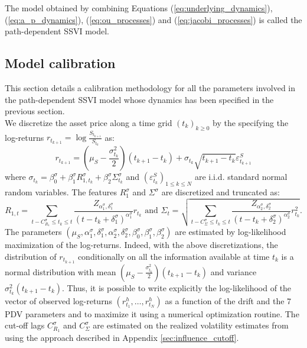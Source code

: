\begin{remark}
    The model obtained by combining Equations (\ref{eq:underlying_dynamics}), (\ref{eq:a_p_dynamics}), (\ref{eq:ou_processes}) and (\ref{eq:jacobi_processes}) is called the path-dependent SSVI model. 
\end{remark}


\subsection{Model calibration}\label{sec:model_calibration}
This section details a calibration methodology for all the parameters involved in the path-dependent SSVI model whose dynamics has been specified in the previous section. \\

We discretize the asset price along a time grid $(t_k)_{k\ge 0}$ by the specifying the log-returns $r_{t_{k+1}}=\log \frac{S_{t_{k+1}}}{S_{t_k}}$ as:
\begin{equation*}
    r_{t_{k+1}} = \left(\mu_S-\frac{\sigma_{t_k}^2}{2}\right)(t_{k+1}-t_k) + \sigma_{t_k} \sqrt{t_{k+1}-t_k} \varepsilon_{t_{k+1}}^S
\end{equation*}
where $\sigma_{t_k} = \beta_0^{\sigma}+\beta_1^{\sigma}R_{1,t_k}^{\sigma}+\beta_2^{\sigma}\Sigma_{t_k}^{\sigma}$ and $(\varepsilon^S_{t_k})_{1\le k \le N}$ are i.i.d. standard normal random variables. The features $R_1^{\sigma}$ and $\Sigma^{\sigma}$ are discretized and truncated as:
\begin{equation*}
    R_{1,t} = \sum_{t-C_{R_1}^{\sigma}\le t_k \le t} \frac{Z_{\alpha_1^{\sigma},\delta_1^{\sigma}}}{(t-t_k+\delta_1^{\sigma})^{\alpha_1^{\sigma}}} r_{t_k} \text{ and } \Sigma_{t} = \sqrt{\sum_{t-C_{\Sigma}^{\sigma}\le t_k \le t} \frac{Z_{\alpha_2^{\sigma},\delta_2^{\sigma}}}{(t-t_k+\delta_2^{\sigma})^{\alpha_2^{\sigma}}} r_{t_k}^2}.
\end{equation*}
The parameters $(\mu_S,\alpha_1^{\sigma},\delta_1^{\sigma},\alpha_2^{\sigma},\delta_2^{\sigma},\beta_0^{\sigma},\beta_1^{\sigma},\beta_2^{\sigma})$ are estimated by log-likelihood maximization of the log-returns. Indeed, with the above discretizations, the distribution of $r_{t_{k+1}}$ conditionally on all the information available at time $t_k$ is a normal distribution with mean $ \left(\mu_S-\frac{\sigma_{t_k}^2}{2}\right)(t_{k+1}-t_k)$ and variance $\sigma_{t_k}^2 (t_{k+1}-t_k)$. Thus, it is possible to write explicitly the log-likelihood of the vector of observed log-returns $(r^h_{t_1},\dots,r^h_{t_N})$ as a function of the drift and the 7 PDV parameters and to maximize it using a numerical optimization routine. The cut-off lags $C_{R_1}^{\sigma}$ and $C_{\Sigma}^{\sigma}$ are estimated on the realized volatility estimates from \cite{heber2009oxford} using the approach described in Appendix \ref{sec:influence_cutoff}.\\

